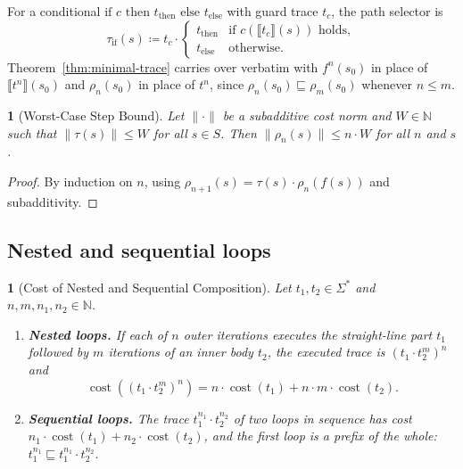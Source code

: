 \documentclass[oneside,english]{amsart}
\numberwithin{equation}{section}
\numberwithin{figure}{section}
\theoremstyle{plain}
\theoremstyle{definition}
\theoremstyle{plain}
\newtheorem{prop}[thm]{\protect\propositionname}
\theoremstyle{remark}
\theoremstyle{plain}
\theoremstyle{definition}
\theoremstyle{plain}
\theoremstyle{remark}
\DeclareMathOperator{\cost}{cost}
\newcommand{\sem}[1]{\llbracket #1 \rrbracket}
\providecommand{\propositionname}{Proposition}
\begin{document}
For a conditional $\text{if } c \text{ then } t_{\text{then}} \text{ else } t_{\text{else}}$ with guard trace $t_c$, the path selector is
\begin{equation}
\label{eq:cond-selector}
\tau_{\text{if}}(s) \coloneqq t_c \cdot \begin{cases} t_{\text{then}} & \text{if } c(\sem{t_c}(s)) \text{ holds}, \\ t_{\text{else}} & \text{otherwise.} \end{cases}
\end{equation}
Theorem~\ref{thm:minimal-trace} carries over verbatim with $f^n(s_0)$ in place of $\sem{t^n}(s_0)$ and $\rho_n(s_0)$ in place of $t^n$, since $\rho_n(s_0) \sqsubseteq \rho_m(s_0)$ whenever $n \le m$.

\begin{prop}[Worst-Case Step Bound]\label{prop:worst-case-step}
Let $\|\cdot\|$ be a subadditive cost norm and $W \in \mathbb{N}$ such that $\|\tau(s)\| \le W$ for all $s \in S$. Then $\|\rho_n(s)\| \le n \cdot W$ for all $n$ and $s$.
\end{prop}

\begin{proof}
By induction on $n$, using $\rho_{n+1}(s) = \tau(s) \cdot \rho_n(f(s))$ and subadditivity.
\end{proof}

\subsection{Nested and sequential loops}

\begin{prop}[Cost of Nested and Sequential Composition]\label{prop:nested-cost}
Let $t_1, t_2 \in \Sigma^*$ and $n, m, n_1, n_2 \in \mathbb{N}$.
\begin{enumerate}
    \item \textbf{Nested loops.} If each of $n$ outer iterations executes the straight-line part $t_1$ followed by $m$ iterations of an inner body $t_2$, the executed trace is $(t_1 \cdot t_2^m)^n$ and
    \[
    \cost\left((t_1 \cdot t_2^m)^n\right) = n \cdot \cost(t_1) + n \cdot m \cdot \cost(t_2).
    \]
    \item \textbf{Sequential loops.} The trace $t_1^{n_1} \cdot t_2^{n_2}$ of two loops in sequence has cost $n_1 \cdot \cost(t_1) + n_2 \cdot \cost(t_2)$, and the first loop is a prefix of the whole: $t_1^{n_1} \sqsubseteq t_1^{n_1} \cdot t_2^{n_2}$.
\end{enumerate}
\end{prop}
\end{document}
